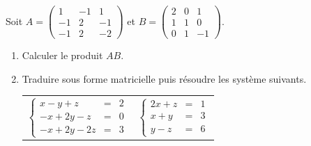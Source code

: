 \documentclass[11pt,fleqn]{book} %
\begin{document}
\begin{exercise}[topic=mat03]Soit $A=\begin{pmatrix}1 & -1 & 1\\ -1 & 2 & -1 \\ -1 & 2 & -2\end{pmatrix}$ et $B=\begin{pmatrix}2 & 0 & 1 \\ 1&1&0 \\ 0& 1& -1\end{pmatrix}$.
\begin{enumerate}
\item Calculer le produit $AB$.
\item Traduire sous forme matricielle puis résoudre les système suivants.

\begin{tabularx}{\linewidth}{XX}

$\left\{\begin{array}{rcl} x-y+z & =& 2 \\ -x+2y-z&=& 0 \\ -x+2y-2z &=&3\end{array}\right.$ & $\left\{\begin{array}{rcl} 2x+z&=&1 \\ x+y &=& 3 \\ y - z &=& 6\end{array}\right.$ \end{tabularx}

\end{enumerate}\end{exercise}
\end{document}
